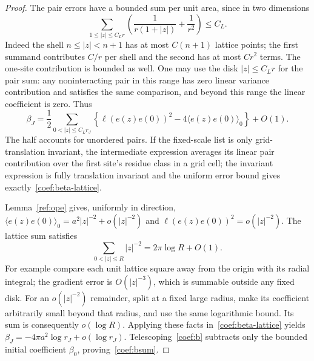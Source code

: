 \begin{proof}
The pair errors have a bounded sum per unit area, since in two dimensions
\begin{equation}\label{coef:error-sum}
 \sum_{1\le |z|\le C_Lr}
        \left(\frac1{r(1+|z|)}+\frac1{r^2}\right)\le C_L.
\end{equation}
Indeed the shell $n\le |z|<n+1$ has at most $C(n+1)$ lattice points; the
first summand contributes $C/r$ per shell and the second has at most
$C r^2$ terms.  The one-site contribution is bounded as well.
One may use the disk $|z|\le C_Lr$ for the pair sum: any noninteracting
pair in this range has zero linear variance contribution and satisfies
the same comparison, and beyond this range the linear coefficient is zero.
Thus
\begin{equation}\label{coef:beta-lattice}
 \beta_J=\frac12\sum_{0<|z|\le C_Lr_J}
       \left\{\ell(e(z)e(0))^2-4\langle e(z)e(0)\rangle_0\right\}+O(1).
\end{equation}
The half accounts for unordered pairs.  If the fixed-scale list is only
grid-translation invariant, the intermediate expression averages its
linear pair contribution over the first site's residue class in a grid
cell; the invariant expression is fully translation invariant and the
uniform error bound gives exactly~\eqref{coef:beta-lattice}.

Lemma~\ref{ref:ope} gives, uniformly in direction,
$\langle e(z)e(0)\rangle_0=a^2|z|^{-2}+o(|z|^{-2})$ and
$\ell(e(z)e(0))^2=o(|z|^{-2})$.  The lattice sum satisfies
\[
 \sum_{0<|z|\le R}|z|^{-2}=2\pi\log R+O(1).
\]
For example compare each unit lattice square away from the origin with
its radial integral; the gradient error is $O(|z|^{-3})$, which is summable
outside any fixed disk.  For an $o(|z|^{-2})$ remainder, split at a fixed
large radius, make its coefficient arbitrarily small beyond that radius,
and use the same logarithmic bound.  Its sum is consequently $o(\log R)$.
Applying these facts in~\eqref{coef:beta-lattice} yields
$\beta_J=-4\pi a^2\log r_J+o(\log r_J)$.
Telescoping~\eqref{coef:b} subtracts only the bounded initial coefficient
$\beta_0$, proving~\eqref{coef:bsum}.


\end{proof}
